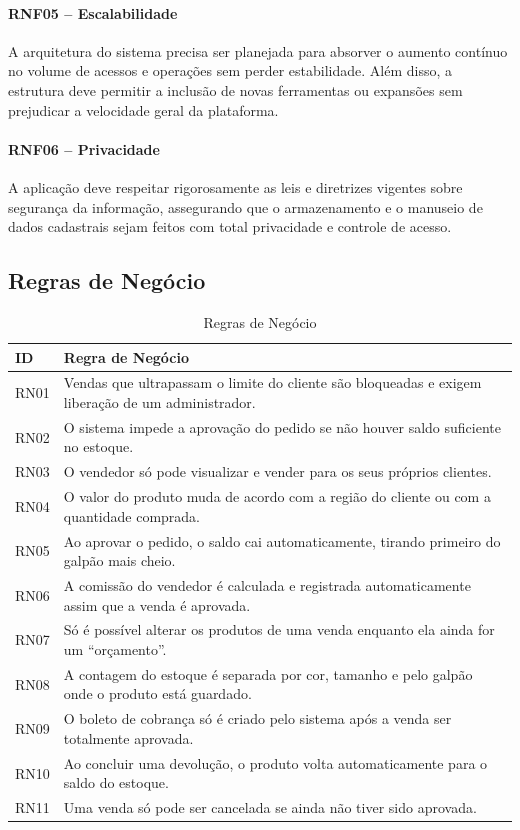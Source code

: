 \documentclass[12pt,a4paper]{article}
\begin{document}
\paragraph*{RNF05 -- Escalabilidade}
A arquitetura do sistema precisa ser planejada para absorver o aumento contínuo no volume de acessos e operações sem perder estabilidade. Além disso, a estrutura deve permitir a inclusão de novas ferramentas ou expansões sem prejudicar a velocidade geral da plataforma.

\paragraph*{RNF06 -- Privacidade}
A aplicação deve respeitar rigorosamente as leis e diretrizes vigentes sobre segurança da informação, assegurando que o armazenamento e o manuseio de dados cadastrais sejam feitos com total privacidade e controle de acesso.

\subsection{Regras de Negócio}

\begin{table}[h!]
  \centering
  \begin{tabularx}{\textwidth}{p{1.5cm} X}
    \toprule
    \textbf{ID} & \textbf{Regra de Negócio} \\
    \midrule
    RN01 & Vendas que ultrapassam o limite do cliente são bloqueadas e exigem liberação de um administrador. \\
    \addlinespace
    RN02 & O sistema impede a aprovação do pedido se não houver saldo suficiente no estoque. \\
    \addlinespace
    RN03 & O vendedor só pode visualizar e vender para os seus próprios clientes. \\
    \addlinespace
    RN04 & O valor do produto muda de acordo com a região do cliente ou com a quantidade comprada. \\
    \addlinespace
    RN05 & Ao aprovar o pedido, o saldo cai automaticamente, tirando primeiro do galpão mais cheio. \\
    \addlinespace
    RN06 & A comissão do vendedor é calculada e registrada automaticamente assim que a venda é aprovada. \\
    \addlinespace
    RN07 & Só é possível alterar os produtos de uma venda enquanto ela ainda for um ``orçamento''. \\
    \addlinespace
    RN08 & A contagem do estoque é separada por cor, tamanho e pelo galpão onde o produto está guardado. \\
    \addlinespace
    RN09 & O boleto de cobrança só é criado pelo sistema após a venda ser totalmente aprovada. \\
    \addlinespace
    RN10 & Ao concluir uma devolução, o produto volta automaticamente para o saldo do estoque. \\
    \addlinespace
    RN11 & Uma venda só pode ser cancelada se ainda não tiver sido aprovada. \\
    \bottomrule
  \end{tabularx}
  \caption{Regras de Negócio}
\end{table}
\end{document}
